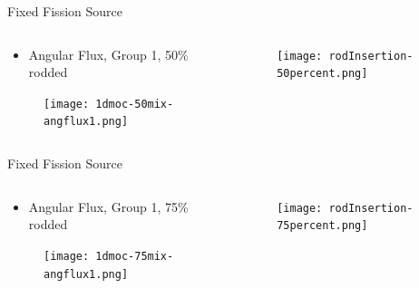 
\begin{frame}[t]{Fixed Fission Source}

\begin{columns}
    \begin{column}{0.6\textwidth}
        \begin{itemize}
            \item Angular Flux, Group 1, 50\% rodded
        \end{itemize}
        \begin{figure}[H]
            \centering
            \texttt{[image: 1dmoc-50mix-angflux1.png]}
        \end{figure}
    \end{column}
    \begin{column}{0.4\textwidth}
        \begin{figure}[H]
            \centering
            \texttt{[image: rodInsertion-50percent.png]}
        \end{figure}
    \end{column}
\end{columns}

\end{frame}


\begin{frame}[t]{Fixed Fission Source}

\begin{columns}
    \begin{column}{0.6\textwidth}
        \begin{itemize}
            \item Angular Flux, Group 1, 75\% rodded
        \end{itemize}
        \begin{figure}[H]
            \centering
            \texttt{[image: 1dmoc-75mix-angflux1.png]}
        \end{figure}
    \end{column}
    \begin{column}{0.4\textwidth}
        \begin{figure}[H]
            \centering
            \texttt{[image: rodInsertion-75percent.png]}
        \end{figure}
    \end{column}
\end{columns}

\end{frame}

